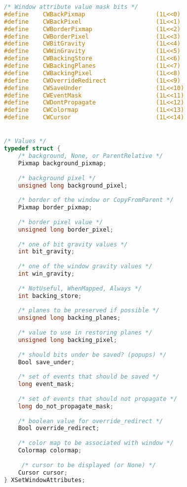 \begin{lstlisting}[language=C]
/* Window attribute value mask bits */
#define    CWBackPixmap                    (1L<<0)
#define    CWBackPixel                     (1L<<1)
#define    CWBorderPixmap                  (1L<<2)
#define    CWBorderPixel                   (1L<<3)
#define    CWBitGravity                    (1L<<4)
#define    CWWinGravity                    (1L<<5)
#define    CWBackingStore                  (1L<<6)
#define    CWBackingPlanes                 (1L<<7)
#define    CWBackingPixel                  (1L<<8)
#define    CWOverrideRedirect              (1L<<9)
#define    CWSaveUnder                     (1L<<10)
#define    CWEventMask                     (1L<<11)
#define    CWDontPropagate                 (1L<<12)
#define    CWColormap                      (1L<<13)
#define    CWCursor                        (1L<<14)


/* Values */
typedef struct {
	/* background, None, or ParentRelative */
	Pixmap background_pixmap;  
	
	/* background pixel */   
	unsigned long background_pixel;
	
	/* border of the window or CopyFromParent */     
	Pixmap border_pixmap;   
	
	/* border pixel value */       
	unsigned long border_pixel; 
	
	/* one of bit gravity values */    
	int bit_gravity;  
	
	/* one of the window gravity values */   
	int win_gravity;
	
	/* NotUseful, WhenMapped, Always */     
	int backing_store;     
	
	/* planes to be preserved if possible */
	unsigned long backing_planes; 
	
	/* value to use in restoring planes */    
	unsigned long backing_pixel;  
	
	/* should bits under be saved? (popups) */   
	Bool save_under;     
	
	/* set of events that should be saved */
	long event_mask;     
	
	/* set of events that should not propagate */
	long do_not_propagate_mask;  
	
	/* boolean value for override_redirect */   
	Bool override_redirect;   
	
	/* color map to be associated with window */  
	Colormap colormap;   
	
	 /* cursor to be displayed (or None) */  
	Cursor cursor;         
} XSetWindowAttributes;
\end{lstlisting}

